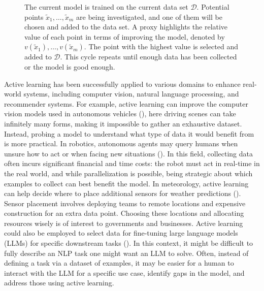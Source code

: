 \documentclass[
  letterpaper,
  numbers=noenddot,
  DIV=11]{scrreprt}
\theoremstyle{plain}
\theoremstyle{definition}
\theoremstyle{plain}
\theoremstyle{remark}
\begin{document}
\begin{figure}


\caption{\label{fig-schema}The current model is trained on the current
data set \(\mathcal{D}\). Potential points
\(\tilde{x}_1, \ldots, \tilde{x}_m\) are being investigated, and one of
them will be chosen and added to the data set. A proxy highlights the
relative value of each point in terms of improving the model, denoted by
\(v(\tilde{x}_1), \ldots, v(\tilde{x}_m)\). The point with the highest
value is selected and added to \(\mathcal{D}\). This cycle repeats until
enough data has been collected or the model is good enough.}

\end{figure}%

Active learning has been successfully applied to various domains to
enhance real-world systems, including computer vision, natural language
processing, and recommender systems. For example, active learning can
improve the computer vision models used in autonomous vehicles
(), here driving
scenes can take infinitely many forms, making it impossible to gather an
exhaustive dataset. Instead, probing a model to understand what type of
data it would benefit from is more practical. In robotics, autonomous
agents may query humans when unsure how to act or when facing new
situations (). In this field, collecting data often incurs significant
financial and time costs: the robot must act in real-time in the real
world, and while parallelization is possible, being strategic about
which examples to collect can best benefit the model. In meteorology,
active learning can help decide where to place additional sensors for
weather predictions (). Sensor placement involves deploying teams to remote
locations and expensive construction for an extra data point. Choosing
these locations and allocating resources wisely is of interest to
governments and businesses. Active learning could also be employed to
select data for fine-tuning large language models (LLMs) for specific
downstream tasks (). In
this context, it might be difficult to fully describe an NLP task one
might want an LLM to solve. Often, instead of defining a task via a
dataset of examples, it may be easier for a human to interact with the
LLM for a specific use case, identify gaps in the model, and address
those using active learning.
\end{document}
